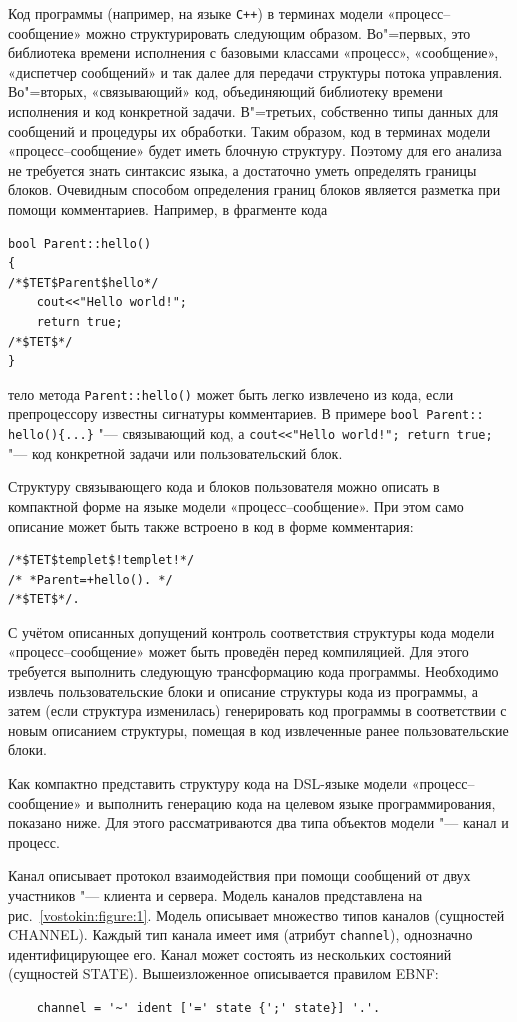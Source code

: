 Код программы (например, на языке {\tt С++}) в терминах модели «процесс--сообщение» можно структурировать следующим образом. 
Во"=первых, это библиотека времени исполнения с базовыми классами «процесс», «сообщение», «диспетчер сообщений» и так далее для передачи структуры потока управления. 
Во"=вторых,  «связывающий»  код, объединяющий библиотеку времени исполнения и код конкретной задачи. 
В"=третьих,   собственно типы данных для сообщений и процедуры их обработки. 
Таким образом, код в терминах модели «процесс--сообщение» будет иметь блочную структуру. 
Поэтому для его анализа не требуется знать синтаксис языка, а достаточно уметь определять границы блоков. 
Очевидным способом определения границ блоков является разметка при помощи комментариев. 
Например, в фрагменте кода
\begin{verbatim}
bool Parent::hello()
{
/*$TET$Parent$hello*/
    cout<<"Hello world!";
    return true;
/*$TET$*/
}
\end{verbatim}
тело метода {\tt Parent::hello()} может быть легко извлечено из кода, если препроцессору известны сигнатуры комментариев. 
В примере {\tt bool Parent:: hello()\{...\}} "--- связывающий код, а {\tt cout{<}<"Hello world!"; return true;} "--- код конкретной задачи или пользовательский блок.

Структуру связывающего кода и блоков пользователя можно описать в компактной форме на языке модели «процесс--сообщение». 
При этом само описание может быть также встроено  в код в форме комментария:
\begin{verbatim}
/*$TET$templet$!templet!*/
/* *Parent=+hello(). */
/*$TET$*/.
\end{verbatim}

С учётом описанных допущений контроль соответствия структуры кода модели «процесс--сообщение» может быть проведён перед компиляцией. 
Для этого требуется выполнить следующую трансформацию кода программы. 
Необходимо извлечь пользовательские блоки и описание структуры кода из программы, а затем (если структура изменилась) генерировать код программы в соответствии с новым описанием структуры, помещая в код извлеченные ранее пользовательские блоки.

Как компактно представить структуру кода на DSL-языке модели «про\-цесс--сообщение» и выполнить генерацию кода на целевом языке программирования, показано ниже. Для этого рассматриваются два типа объектов модели "--- канал и процесс.

\smallskip

Канал описывает протокол взаимодействия при помощи сообщений от двух участников "--- клиента и сервера. 
Модель каналов представлена на рис.~\ref{vostokin:figure:1}. 
Модель описывает множество типов каналов (сущностей CHANNEL). 
Каждый тип канала имеет имя (атрибут {\tt channel}), однозначно идентифицирующее его. 
Канал может состоять из нескольких состояний (сущностей STATE). 
Вышеизложенное описывается правилом EBNF:
\begin{verbatim}
    channel = '~' ident ['=' state {';' state}] '.'.
\end{verbatim}

